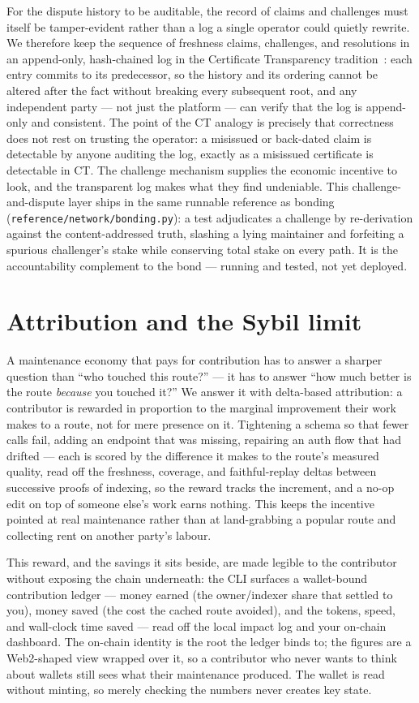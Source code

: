 \documentclass[11pt]{article}
\begin{document}
For the dispute history to be auditable, the record of claims and challenges must
itself be tamper-evident rather than a log a single operator could quietly rewrite.
We therefore keep the sequence of freshness claims, challenges, and resolutions in
an append-only, hash-chained log in the Certificate Transparency
tradition~\cite{rfc6962}: each entry commits to its predecessor, so the history and
its ordering cannot be altered after the fact without breaking every subsequent
root, and any independent party --- not just the platform --- can verify that the
log is append-only and consistent. The point of the CT analogy is precisely that
correctness does not rest on trusting the operator: a misissued or back-dated claim
is detectable by anyone auditing the log, exactly as a misissued certificate is
detectable in CT. The challenge mechanism supplies the economic incentive to look,
and the transparent log makes what they find undeniable. This challenge-and-dispute
layer ships in the same runnable reference as bonding
(\texttt{reference/network/bonding.py}): a test adjudicates a challenge by
re-derivation against the content-addressed truth, slashing a lying maintainer and
forfeiting a spurious challenger's stake while conserving total stake on every path.
It is the accountability complement to the bond --- running and tested, not yet
deployed.

\section{Attribution and the Sybil limit}

A maintenance economy that pays for contribution has to answer a sharper question
than ``who touched this route?'' --- it has to answer ``how much better is the
route \emph{because} you touched it?'' We answer it with delta-based attribution:
a contributor is rewarded in proportion to the marginal improvement their work
makes to a route, not for mere presence on it. Tightening a schema so that fewer
calls fail, adding an endpoint that was missing, repairing an auth flow that had
drifted --- each is scored by the difference it makes to the route's measured
quality, read off the freshness, coverage, and faithful-replay deltas between
successive proofs of indexing, so the reward tracks the increment, and a no-op edit
on top of someone else's work earns nothing. This keeps the incentive pointed at
real maintenance rather than at land-grabbing a popular route and collecting rent
on another party's labour.

This reward, and the savings it sits beside, are made legible to the contributor
without exposing the chain underneath: the CLI surfaces a
wallet-bound contribution ledger --- money earned (the owner/indexer share that settled to you), money saved
(the cost the cached route avoided), and the tokens, speed, and wall-clock time
saved --- read off the local impact log and your on-chain dashboard. The on-chain
identity is the root the ledger binds to; the figures are a Web2-shaped view wrapped
over it, so a contributor who never wants to think about wallets still sees what
their maintenance produced. The wallet is read without minting, so merely checking
the numbers never creates key state.
\end{document}
